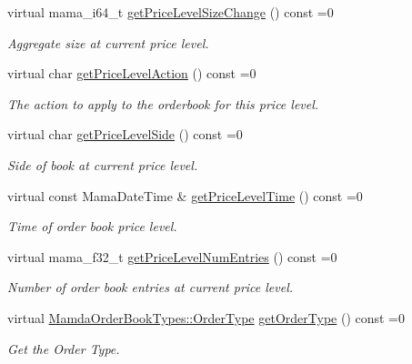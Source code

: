 \begin{CompactItemize}
virtual mama\_\-i64\_\-t \hyperlink{classWombat_1_1MamdaBookAtomicLevel_55c19ae02d863ce2007f4332af271f9b}{get\-Price\-Level\-Size\-Change} () const =0
\begin{CompactList}\small\item\em Aggregate size at current price level. \item\end{CompactList}\item 
virtual char \hyperlink{classWombat_1_1MamdaBookAtomicLevel_01015a77e67f21af4f1b53f25d6df2f0}{get\-Price\-Level\-Action} () const =0
\begin{CompactList}\small\item\em The action to apply to the orderbook for this price level. \item\end{CompactList}\item 
virtual char \hyperlink{classWombat_1_1MamdaBookAtomicLevel_db64c3729d50e3334a5d1eeb40aba6a4}{get\-Price\-Level\-Side} () const =0
\begin{CompactList}\small\item\em Side of book at current price level. \item\end{CompactList}\item 
virtual const Mama\-Date\-Time \& \hyperlink{classWombat_1_1MamdaBookAtomicLevel_8eebd8c5bc48668b4f42afdcfa2e11ff}{get\-Price\-Level\-Time} () const =0
\begin{CompactList}\small\item\em Time of order book price level. \item\end{CompactList}\item 
virtual mama\_\-f32\_\-t \hyperlink{classWombat_1_1MamdaBookAtomicLevel_8a11dfebeccc889960a783b7e4377735}{get\-Price\-Level\-Num\-Entries} () const =0
\begin{CompactList}\small\item\em Number of order book entries at current price level. \item\end{CompactList}\item 
virtual \hyperlink{classWombat_1_1MamdaOrderBookTypes_b1b75d93c83c5a1042c392ab46a27291}{Mamda\-Order\-Book\-Types::Order\-Type} \hyperlink{classWombat_1_1MamdaBookAtomicLevel_23ff595e16fe3926bb2714c5c2026841}{get\-Order\-Type} () const =0
\begin{CompactList}\small\item\em Get the Order Type. \item\end{CompactList}\item 

\end{CompactItemize}
